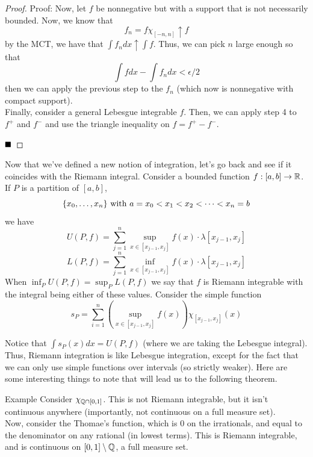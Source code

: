 \begin{proof}{Proof:}
    Now, let $f$ be nonnegative but with a support that is not necessarily bounded. Now, we know that
    \[ f_n = f \chi_{[-n, n]} \uparrow f \]
    by the MCT, we have that $\int f_n dx \uparrow \int f$. Thus, we can pick $n$ large enough so that
    \[ \int f dx - \int f_n dx < \epsilon / 2 \]
    then we can apply the previous step to the $f_n$ (which now is nonnegative with compact support).\\

    Finally, consider a general Lebesgue integrable $f$. Then, we can apply step 4 to $f^{+}$ and $f^{-}$ and use the triangle inequality on $f = f^{+} - f^{-}$. 

    $\qed$
\end{proof}

Now that we've defined a new notion of integration, let's go back and see if it coincides with the Riemann integral. Consider a bounded function $f : [a, b] \to \R$. If $P$ is a partition of $[a, b]$,
\[ \{x_0, \ldots, x_n\} \tt{ with } a = x_0 < x_1 < x_2 < \cdots < x_n = b \]
we have
\[ U(P, f) = \sum_{j = 1}^{n} \sup_{x \in [x_{j - 1}, x_j]}f(x) \cdot \lambda[x_{j - 1}, x_{j}] \]
\[ L(P, f) = \sum_{j = 1}^{n} \inf_{x \in [x_{j - 1}, x_j]}f(x) \cdot \lambda[x_{j - 1}, x_{j}] \]
When $\inf_{P} U(P, f) = \sup_{P} L(P, f)$ we say that $f$ is Riemann integrable with the integral being either of these values. Consider the simple function
\[ s_{P} = \sum_{i = 1}^{n} (\sup_{x \in [x_{j - 1}, x_{j}]}f(x) )\chi_{[x_{j - 1}, x_{j}]}(x) \]

Notice that $\int s_{P}(x)dx = U(P, f)$ (where we are taking the Lebesgue integral).\\

Thus, Riemann integration is like Lebesgue integration, except for the fact that we can only use simple functions over intervals (so strictly weaker). Here are some interesting things to note that will lead us to the following theorem.

\begin{example}{Example}
    Consider $\chi_{\Q \cap [0, 1]}$. This is not Riemann integrable, but it isn't continuous anywhere (importantly, not continuous on a full measure set).\\

    Now, consider the Thomae's function, which is $0$ on the irrationals, and equal to the denominator on any rational (in lowest terms). This is Riemann integrable, and is continuous on $[0, 1] \setminus \Q$, a full measure set. 
\end{example}

